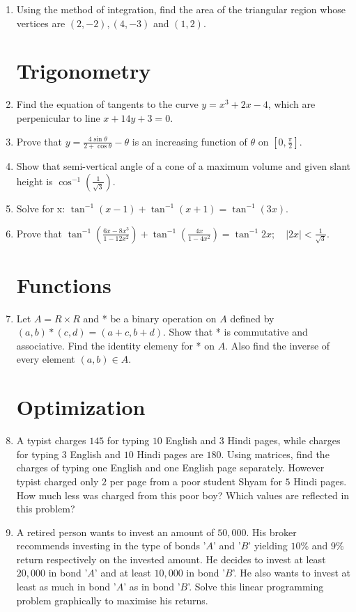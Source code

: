 \documentclass[10pt,-letter paper]{article}
\providecommand{\brak}[1]{\ensuremath{\left(#1\right)}}
\providecommand{\abs}[1]{\left\vert#1\right\vert}
\begin{document}
\begin{enumerate}
\item Using the method of integration, find the area of the triangular region whose vertices are $(2,-2), (4,-3)$ and $(1,2)$.

\section{Trigonometry}

\item Find the equation of tangents to the curve $y=x^3+2x-4$, which are perpenicular to line $x+14y+3=0$.

\item Prove that $y = \frac{4\sin\theta}{2+\cos\theta} - \theta$ is an increasing function of $\theta$ on $\left [0, \frac{\pi}{2}\right ]$.

\item Show that semi-vertical angle of a cone of a maximum volume and given slant height is $\cos^{-1}\brak{\frac{1}{\sqrt{3}}}$.

\item Solve for x: $\tan^{-1}(x-1) + \tan^{-1}(x+1) = \tan^{-1}(3x)$.

\item Prove that $\tan^{-1}\brak{\frac{6x-8x^3}{1-12x^2}} + \tan^{-1}\brak{\frac{4x}{1-4x^2}} = \tan^{-1}2x; \quad \abs{2x}<\frac{1}{\sqrt{3}}$.

\section{Functions}

\item Let $A=R\times R$ and * be a binary operation on $A$ defined by $(a,b)*(c,d) = (a+c,b+d)$.
Show that * is commutative and associative. Find the identity elemeny for * on $A$. Also find the inverse of every element $(a, b) \in A$.

\section{Optimization}

\item A typist charges \rupee $145$ for typing $10$ English and $3$ Hindi pages, while charges for typing $3$ English and $10$ Hindi pages are \rupee $180$. Using matrices, find the charges of typing one English and one English page separately. However typist charged only \rupee $2$ per page from a poor student Shyam for $5$ Hindi pages. How much less was charged from this poor boy? Which values are reflected in this problem?

\item A retired person wants to invest an amount of \rupee $50,000$. His broker recommends investing in the type of bonds '$A$' and '$B$' yielding $10\%$ and $9\%$ return respectively on the invested amount. He decides to invest at least \rupee $20,000$ in bond '$A$' and at least \rupee $10,000$ in bond '$B$'. He also wants to invest at least as much in bond '$A$' as in bond '$B$'. Solve this linear programming problem graphically to maximise his returns.

\end{enumerate}
\end{document}
